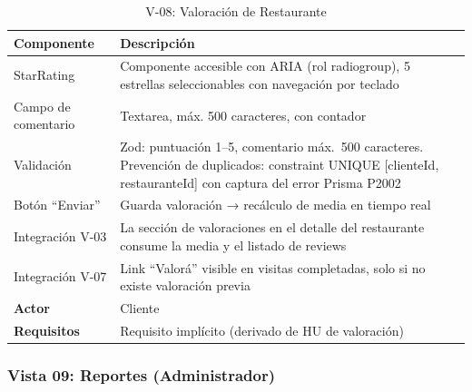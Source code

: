 \begin{table}[H]
    \centering
    \caption{V-08: Valoración de Restaurante}
    \label{tab:vista08}
    \begin{tabular}{|>{\raggedright\arraybackslash}p{}|>{\raggedright\arraybackslash}p{}|}
        \hline
        \textbf{Componente} & \textbf{Descripción} \\
        \hline
        StarRating & Componente accesible con ARIA (rol radiogroup), 5 estrellas seleccionables con navegación por teclado \\
        \hline
        Campo de comentario & Textarea, máx. 500 caracteres, con contador \\
        \hline
        Validación & Zod: puntuación 1--5, comentario máx.\ 500 caracteres. Prevención de duplicados: constraint UNIQUE [clienteId, restauranteId] con captura del error Prisma P2002 \\
        \hline
        Botón ``Enviar'' & Guarda valoración → recálculo de media en tiempo real \\
        \hline
        Integración V-03 & La sección de valoraciones en el detalle del restaurante consume la media y el listado de reviews \\
        \hline
        Integración V-07 & Link ``Valorá'' visible en visitas completadas, solo si no existe valoración previa \\
        \hline
        \textbf{Actor} & Cliente \\
        \hline
        \textbf{Requisitos} & Requisito implícito (derivado de HU de valoración) \\
        \hline
    \end{tabular}
\end{table}

\subsubsection{Vista 09: Reportes (Administrador)}

